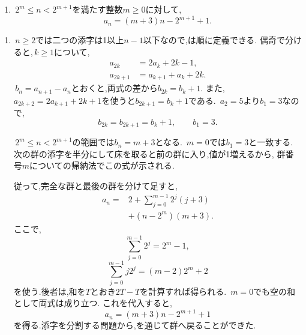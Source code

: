     \noindent {}\par\nobreak
    \begin{enumerate}[label=(\arabic*),parsep=3pt,beginpenalty=10000,format=\bookitemlink{example-gauss-role-7}{answer}{problem}]
      \item \,$2^m\le n<2^{m+1}$を満たす整数$m\ge0$に対して,
            \[
              a_n=(m+3)n-2^{m+1}+1.
            \]
    \end{enumerate}

    \noindent {}\par\nobreak
    \begin{enumerate}[label=(\arabic*),parsep=3pt,beginpenalty=10000,format=\bookitemlink{example-gauss-role-7}{solution}{problem}]
      \item \,$n\ge2$では二つの添字は1以上$n-1$以下なので,は順に定義できる.
            偶奇で分けると,\,$k\ge1$について,
            \[
              \begin{aligned}
                a_{2k}&=2a_k+2k-1,\\
                a_{2k+1}&=a_{k+1}+a_k+2k.
              \end{aligned}
            \]
            \,$b_n=a_{n+1}-a_n$とおくと,両式の差から$b_{2k}=b_k+1$.
            また,\,$a_{2k+2}=2a_{k+1}+2k+1$を使うと$b_{2k+1}=b_k+1$である.
            \,$a_2=5$より$b_1=3$なので,
            \[
              b_{2k}=b_{2k+1}=b_k+1,\qquad b_1=3.
            \]

            \,$2^m\le n<2^{m+1}$の範囲では$b_n=m+3$となる.
            \,$m=0$では$b_1=3$と一致する.
            次の群の添字を半分にして床を取ると前の群に入り,値が1増えるから,
            群番号$m$についての帰納法でこの式が示される.

            従って,完全な群と最後の群を分けて足すと,
            \begin{align*}
              a_n={}&2+\sum_{j=0}^{m-1}2^j(j+3)\\
                   &+(n-2^m)(m+3).
            \end{align*}
            ここで,
            \[
              \sum_{j=0}^{m-1}2^j=2^m-1,
            \]
            \[
              \sum_{j=0}^{m-1}j2^j=(m-2)2^m+2
            \]
            を使う.後者は,和を$T$とおき$2T-T$を計算すれば得られる.
            \,$m=0$でも空の和として両式は成り立つ.
            これを代入すると,
            \[
              a_n=(m+3)n-2^{m+1}+1
            \]
            を得る.添字を分割する問題から,を通じて群へ戻ることができた.
    \end{enumerate}
